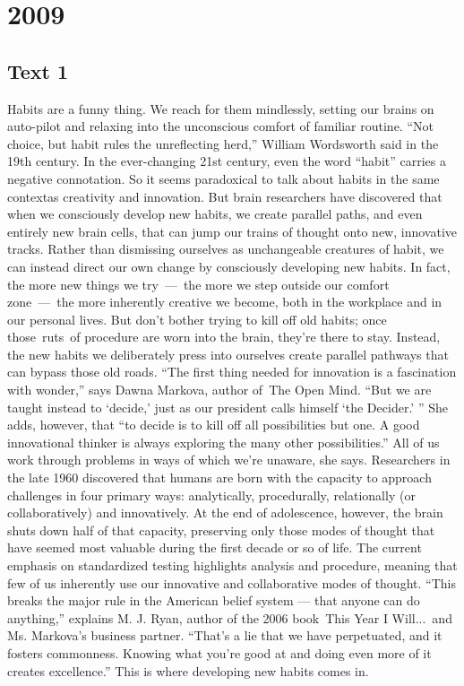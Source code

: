 
\section{2009}
\subsection{Text 1}
Habits are a funny thing. We reach for them mindlessly, setting our brains on auto-pilot and relaxing into the unconscious comfort of familiar routine. “Not choice, but habit rules the unreflecting herd,” William Wordsworth said in the 19th century. In the ever-changing 21st century, even the word “habit” carries a negative connotation.
So it seems paradoxical to talk about habits in the same contextas creativity and innovation. But brain researchers have discovered that when we consciously develop new habits, we create parallel paths, and even entirely new brain cells, that can jump our trains of thought onto new, innovative tracks.
Rather than dismissing ourselves as unchangeable creatures of habit, we can instead direct our own change by consciously developing new habits. In fact, the more new things we try — the more we step outside our comfort zone — the more inherently creative we become, both in the workplace and in our personal lives.
But don’t bother trying to kill off old habits; once those ruts of procedure are worn into the brain, they’re there to stay. Instead, the new habits we deliberately press into ourselves create parallel pathways that can bypass those old roads.
“The first thing needed for innovation is a fascination with wonder,” says Dawna Markova, author of The Open Mind. “But we are taught instead to ‘decide,’ just as our president calls himself ‘the Decider.’ ” She adds, however, that “to decide is to kill off all possibilities but one. A good innovational thinker is always exploring the many other possibilities.”
All of us work through problems in ways of which we’re unaware, she says. Researchers in the late 1960 discovered that humans are born with the capacity to approach challenges in four primary ways: analytically, procedurally, relationally (or collaboratively) and innovatively. At the end of adolescence, however, the brain shuts down half of that capacity, preserving only those modes of thought that have seemed most valuable during the first decade or so of life.
The current emphasis on standardized testing highlights analysis and procedure, meaning that few of us inherently use our innovative and collaborative modes of thought. “This breaks the major rule in the American belief system — that anyone can do anything,” explains M. J. Ryan, author of the 2006 book This Year I Will... and Ms. Markova’s business partner. “That’s a lie that we have perpetuated, and it fosters commonness. Knowing what you’re good at and doing even more of it creates excellence.” This is where developing new habits comes in.
